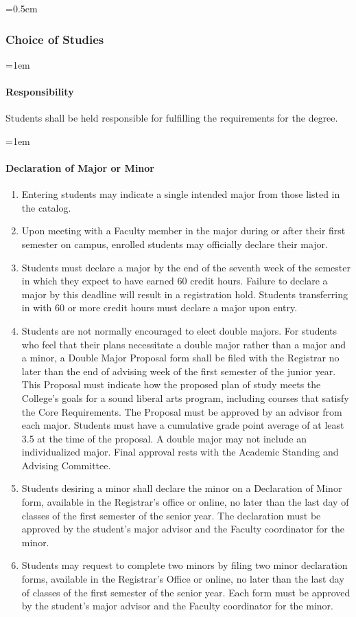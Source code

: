 \documentclass{manual}
\let\oldsubsubsection\subsubsection
\renewcommand\subsubsection{\leftskip=0.5em\oldsubsubsection}
\let\oldparagraph\paragraph
\renewcommand\paragraph{\leftskip=1em\oldparagraph}
\newcommand{\itemLevelA}{\alph*.}
\newcommand{\itemRefA}{\alph*}
\begin{document}
		\subsubsection{Choice of Studies}\label{sub:ChoiceOfStudies}

			\paragraph{Responsibility}
			Students shall be held responsible for fulfilling the requirements for the degree.

			\paragraph{Declaration of Major or Minor}

				\begin{enumerate}[label=\itemLevelA,ref=\itemRefA]
				\item Entering students may indicate a single intended major from those listed in the catalog. 
				\item Upon meeting with a Faculty member in the major during or after their first semester on campus, enrolled students may officially declare their major.
				\item Students must declare a major by the end of the seventh week of the semester in which they expect to have earned 60 credit hours. Failure to declare a major by this deadline will result in a registration hold. Students transferring in with 60 or more credit hours must declare a major upon entry.
				\item Students are not normally encouraged to elect double majors. For students who feel  that their plans necessitate a double major rather than a major and a minor,  a Double Major Proposal form shall be filed with the Registrar no later than the end of advising week of the first semester of the junior year. This Proposal must indicate how the proposed plan of study meets the College's goals for a sound liberal arts program, including courses that satisfy the Core Requirements. The Proposal must be approved by an advisor from each major. Students must have a cumulative grade point average of at least 3.5 at the time of the proposal. A double major may not include an individualized major. Final approval rests with the Academic Standing and Advising Committee.
				\item Students desiring a minor shall declare the minor on a Declaration of Minor form, available in the Registrar's office or online, no later than the last day of classes of the first semester of the senior year. The declaration must be approved by the student's major advisor and the Faculty coordinator for the minor.
				\item Students may request to complete two minors by filing two minor declaration forms, available in the Registrar's Office or online, no later than the last day of classes of the first semester of the senior year. Each form must be approved by the student's major advisor and the Faculty coordinator for the minor.
				\end{enumerate}
\end{document}
